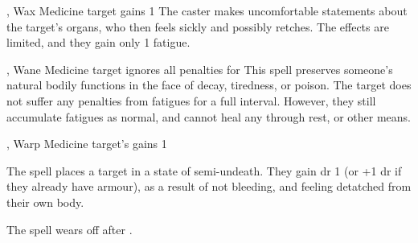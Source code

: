   {\mFate, \mAir}%
  {Wax}%
  {}%
  {Medicine}%
  {target gains 1 }%
  {
    The caster makes uncomfortable statements about the target's organs, who then feels sickly and possibly retches.
    The effects are limited, and they gain only 1 \gls{fatigue}.
  }

  {\mFate, \mAir}%
  {Wane}%
  {}%
  {Medicine}%
  {target ignores all  penalties for }%
  {
    This spell preserves someone's natural bodily functions in the face of decay, tiredness, or poison.
    The target does not suffer any penalties from \glspl{fatigue} for a full \gls{interval}.
    However, they still accumulate \glspl{fatigue} as normal, and cannot heal any through rest, or other means.
  }

  {\mFate, \mAir}%
  {Warp}%
  {}%
  {Medicine}%
  {target's gains  1}%
  {
    The spell places a target in a state of semi-undeath.
    They gain \gls{dr} 1 (or +1 \gls{dr} if they already have armour), as a result of not bleeding, and feeling detatched from their own body.

    The spell wears off after .
  }

